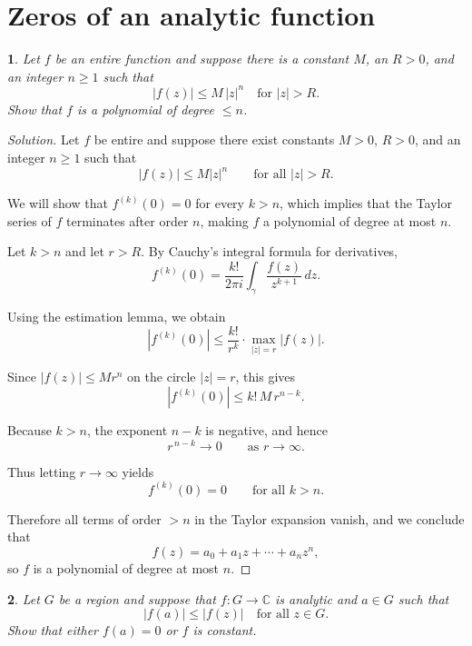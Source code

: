 \documentclass[12pt, a4paper]{report}
\theoremstyle{spaced}
\newtheorem{exercise}{}
\newcommand{\setexercise}[1]{\setcounter{exercise}{#1-1}}
\begin{document}
\section{Zeros of an analytic function}
\setexercise{1}
\begin{exercise}
	Let $f$ be an entire function and suppose there is a constant $M$, an $R>0$, and an integer $n\ge 1$ such that
	\[
		|f(z)| \le M\,|z|^{n} \quad \text{for } |z|>R.
	\]
	Show that $f$ is a polynomial of degree $\le n$.
\end{exercise}

\begin{proof}[Solution]
	Let $f$ be entire and suppose there exist constants $M>0$, $R>0$, and an integer $n\ge 1$ such that
	\[
		|f(z)| \le M |z|^{n} \qquad \text{for all } |z|>R.
	\]

	We will show that $f^{(k)}(0)=0$ for every $k>n$, which implies that the Taylor series of $f$ terminates after order $n$, making $f$ a polynomial of degree at most $n$.

	Let $k>n$ and let $r>R$.
	By Cauchy's integral formula for derivatives,
	\[
		f^{(k)}(0)
		= \frac{k!}{2\pi i} \int_{\gamma} \frac{f(z)}{z^{k+1}}\,dz.
	\]

	Using the estimation lemma, we obtain
	\[
		|f^{(k)}(0)|
		\le \frac{k!}{r^k} \cdot \max_{|z|=r} |f(z)|.
	\]

	Since $|f(z)| \le M r^{n}$ on the circle $|z|=r$, this gives
	\[
		|f^{(k)}(0)| \le k! \, M \, r^{n-k}.
	\]

	Because $k>n$, the exponent $n-k$ is negative, and hence
	\[
		r^{\,n-k} \to 0 \qquad \text{as } r\to\infty.
	\]

	Thus letting $r\to\infty$ yields
	\[
		f^{(k)}(0)=0 \qquad\text{for all } k>n.
	\]

	Therefore all terms of order $>n$ in the Taylor expansion vanish, and we conclude that
	\[
		f(z) = a_0 + a_1 z + \cdots + a_n z^n,
	\]
	so $f$ is a polynomial of degree at most $n$.
\end{proof}

\setexercise{6}
\begin{exercise}
	Let $G$ be a region and suppose that $f : G \to \mathbb{C}$ is analytic and $a\in G$ such that
	\[
		|f(a)| \le |f(z)| \quad \text{for all } z\in G.
	\]
	Show that either $f(a)=0$ or $f$ is constant.
\end{exercise}
\end{document}
